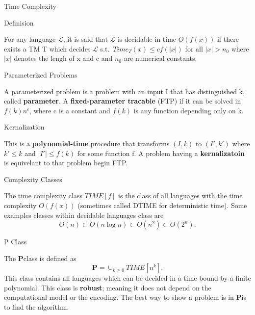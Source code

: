 \documentclass[12pt, letterpaper]{article}
\newcommand{\Ll}{\mathscr{L}}
\newcommand{\Ls}{\(\Ll\)}
\newcommand{\p}{\textbf{P}}
\begin{document}
\begin{section}{Time Complexity}

  \begin{subsection}{Definision}

    For any language \Ls, it is said that \Ls{} is decidable in time
    \(O(f(x))\) if there exists a TM T which decides \Ls{} s.t.\
    \(Time_{T}(x) \leq cf(| x |)\) for all \(| x | > n_{0}\) where \(| x |\)
    denotes the lengh of x and c and \(n_{0}\) are numerical constants.

  \end{subsection}

  \begin{subsection}{Parameterized Problems}

    A parameterized problem is a problem with an input I that has distinguished
    k, called \textbf{parameter}. A \textbf{fixed-parameter tracable} (FTP) if
    it can be solved in \(f(k) n^{c}\), where c is a constant and \(f(k)\) is
    any function depending only on k.

    \begin{subsubsection}{Kernalization}

      This is a \textbf{polynomial-time} procedure that transforms \((I, k)\)
      to \((I', k')\) where \(k' \leq k\) and \(|I'| \leq f(k)\) for some
      function f. A problem having a \textbf{kernalizatoin} is equivelant to
      that problem begin FTP.

    \end{subsubsection}

  \end{subsection}

  \begin{subsection}{Complexity Classes}

    The time complexity class \(TIME[f]\) is the class of all languages with
    the time complexity \(O(f(x))\) (sometimes called DTIME for deterministic
    time). Some examples classes within decidable languages class are
    \[O(n) \subset O(n \log n) \subset O(n^{2}) \subset O(2^{n}).\]

    \begin{subsubsection}{P Class}

      The \p class is defined as \[\p = \cup_{k \geq 0} TIME[n^{k}].\] This
      class contains all languages which can be decided in a time bound by a
      finite polynomial. This class is \textbf{robust};
      meaning it does not depend on the computational model or the encoding.
      The best way to show a problem is in \p is to find the algorithm.


\end{subsubsection}
\end{subsection}
\end{section}
\end{document}

